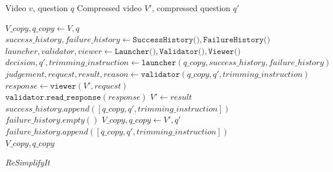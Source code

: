\begin{figure}[htbp] 
    
    \centering
    \begin{minipage}{\textwidth} 
        \begin{algorithm}[H] 
            \caption{\emph{ReSimplifyIt}}
            \label{alg_ReSimplify}
            \small
            \begin{algorithmic}[1]
                \Require Video $v$, question $q$
                \Ensure Compressed video $V'$, compressed question $q'$

                \State $V\_copy, q\_copy \gets V, q$
                \State $success\_history, failure\_history \gets \texttt{SuccessHistory()}, \texttt{FailureHistory()}$
                    \State $launcher, validator, viewer \gets \texttt{Launcher()}, \texttt{Validator()}, \texttt{Viewer()}$
                    \State $decision, q', trimming\_instruction \gets \texttt{launcher}(q\_copy, success\_history, failure\_history)$
                        \State $judgement, request, result, reason \gets \texttt{validator}(q\_copy, q', trimming\_instruction)$
                            \State $response \gets \texttt{viewer}(V', request)$
                            \State $\texttt{validator.read\_response}(response)$
                        \EndWhile
                            \State $V' \gets result$
                            \State $success\_history.append([q\_copy, q', trimming\_instruction])$
                            \State $failure\_history.empty()$
                            \State $V\_copy, q\_copy \gets V', q'$
                        \Else
                            \State $failure\_history.append([q\_copy, q', trimming\_instruction])$
                        \EndIf
                    \Else
                        \State \Return $V\_copy, q\_copy$
                    \EndIf
                \EndWhile
            \end{algorithmic}
        \label{alg_emc}
        \end{algorithm}
        
    \end{minipage}
\end{figure}


